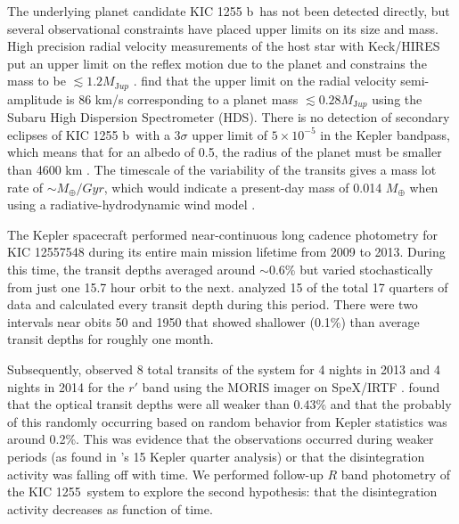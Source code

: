 \documentclass[preprint]{aastex61}
\newcommand{\sha}{KIC 1255 b}
\newcommand{\shStar}{KIC 1255}
\begin{document}
The underlying planet candidate \sha\ has not been detected directly, but several observational constraints have placed upper limits on its size and mass.
High precision radial velocity measurements of the host star with Keck/HIRES put an upper limit on the reflex motion due to the planet and constrains the mass to be $\lesssim 1.2 M_{\mathrm Jup}$ \citep{croll2014}.
\citet{masuda2018rvKIC1255} find that the upper limit on the radial velocity semi-amplitude is 86 km/s corresponding to a planet mass $\lesssim 0.28 M_{\mathrm Jup}$ using the Subaru High Dispersion Spectrometer (HDS).
There is no detection of secondary eclipses of \sha\ with a 3$\sigma$ upper limit of $5 \times 10^{-5}$ in the Kepler bandpass, which means that for an albedo of 0.5, the radius of the planet must be smaller than 4600 km \citep{vanWerkhoven2014}.
The timescale of the variability of the transits gives a mass lot rate of $\sim M_\oplus/Gyr$, which would indicate a present-day mass of 0.014 $M_\oplus$ when using a radiative-hydrodynamic wind model \citep{perez-becker}.

The Kepler spacecraft performed near-continuous long cadence photometry for KIC 12557548 during its entire main mission lifetime from 2009 to 2013.
During this time, the transit depths averaged around $\sim$0.6\% but varied stochastically from just one 15.7 hour orbit to the next.
\citet{vanWerkhoven2014} analyzed 15 of the total 17 quarters of data and calculated every transit depth during this period.
There were two intervals near obits 50 and 1950 that showed shallower (0.1\%) than average transit depths for roughly one month.

Subsequently, \citet{schlawin2016kic1255} observed 8 total transits of the system for 4 nights in 2013 and 4 nights in 2014 for the $r'$ band using the MORIS imager \citep{Gulbis2011} on SpeX/IRTF \citep{rayner03}.
\citet{schlawin2016kic1255} found that the optical transit depths were all weaker than $0.43\%$ and that the probably of this randomly occurring based on random behavior from Kepler statistics was around 0.2\%.
This was evidence that the observations occurred during weaker periods (as found in \citet{vanWerkhoven2014}'s 15 Kepler quarter analysis) or that the disintegration activity was falling off with time.
We performed follow-up $R$ band photometry of the \shStar\ system to explore the second hypothesis: that the disintegration activity decreases as function of time.
\end{document}
